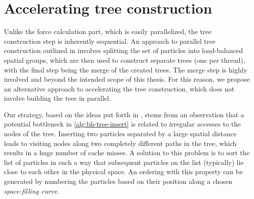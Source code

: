 \section{Accelerating tree construction}\label{sec:accelerating-tree-construction}
Unlike the force calculation part, which is easily parallelized, the tree construction step is inherently sequential.
An approach to parallel tree construction outlined in \cite{warren_salmon_1993} involves splitting the set of particles into load-balanced spatial groups, which are then used to construct separate trees (one per thread), with the final step being the merge of the created trees.
The merge step is highly involved and beyond the intended scope of this thesis.
For this reason, we propose an alternative approach to accelerating the tree construction, which does not involve building the tree in parallel.

Our strategy, based on the ideas put forth in \cite{warren_salmon_1993}, stems from an observation that a potential bottleneck in \autoref{alg:bh-tree-insert} is related to irregular accesses to the nodes of the tree.
Inserting two particles separated by a large spatial distance leads to visiting nodes along two completely different paths in the tree, which results in a huge number of cache misses.
A solution to this problem is to sort the list of particles in such a way that subsequent particles on the list (typically) lie close to each other in the physical space.
An ordering with this property can be generated by numbering the particles based on their position along a chosen \textit{space-filling curve}.


